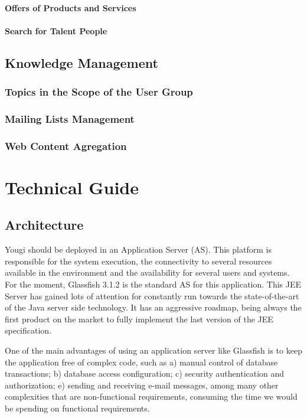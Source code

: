\documentclass[envcountsame,envcountchap,letterpaper]{svmono}
\begin{document}
\subsection{Offers of Products and Services}

\subsection{Search for Talent People}

\chapter{Knowledge Management}

\section{Topics in the Scope of the User Group}

\section{Mailing Lists Management}

\section{Web Content Agregation}

\part{Technical Guide}

\chapter{Architecture}

Yougi should be deployed in an Application Server (AS). This platform is responsible for the system execution, the connectivity to several resources available in the environment and the availability for several users and systems. For the moment, Glassfish 3.1.2 is the standard AS for this application. This JEE Server has gained lots of attention for constantly run towards the state-of-the-art of the Java server side technology. It has an aggressive roadmap, being always the first product on the market to fully implement the last version of the JEE specification.

One of the main advantages of using an application server like Glassfish is to keep the application free of complex code, such as a) manual control of database transactions; b) database access configuration; c) security authentication and authorization; e) sending and receiving e-mail messages, among many other complexities that are non-functional requirements, consuming the time we would be spending on functional requirements.
\end{document}
